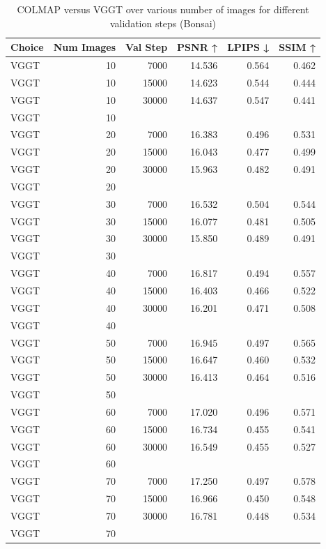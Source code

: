 \begin{table}[H]
\caption{COLMAP versus VGGT over various number of images for different validation steps (Bonsai)}
\label{tab:01_num_images_30000_bonsai}
\begin{tabular}{lrrrrr}
\toprule
Choice & Num Images & Val Step & PSNR ↑ & LPIPS ↓ & SSIM ↑ \\
\midrule
VGGT & 10 & 7000 & 14.536 & 0.564 & 0.462 \\
VGGT & 10 & 15000 & 14.623 & 0.544 & 0.444 \\
VGGT & 10 & 30000 & 14.637 & 0.547 & 0.441 \\
VGGT & 10 &  &  &  &  \\
VGGT & 20 & 7000 & 16.383 & 0.496 & 0.531 \\
VGGT & 20 & 15000 & 16.043 & 0.477 & 0.499 \\
VGGT & 20 & 30000 & 15.963 & 0.482 & 0.491 \\
VGGT & 20 &  &  &  &  \\
VGGT & 30 & 7000 & 16.532 & 0.504 & 0.544 \\
VGGT & 30 & 15000 & 16.077 & 0.481 & 0.505 \\
VGGT & 30 & 30000 & 15.850 & 0.489 & 0.491 \\
VGGT & 30 &  &  &  &  \\
VGGT & 40 & 7000 & 16.817 & 0.494 & 0.557 \\
VGGT & 40 & 15000 & 16.403 & 0.466 & 0.522 \\
VGGT & 40 & 30000 & 16.201 & 0.471 & 0.508 \\
VGGT & 40 &  &  &  &  \\
VGGT & 50 & 7000 & 16.945 & 0.497 & 0.565 \\
VGGT & 50 & 15000 & 16.647 & 0.460 & 0.532 \\
VGGT & 50 & 30000 & 16.413 & 0.464 & 0.516 \\
VGGT & 50 &  &  &  &  \\
VGGT & 60 & 7000 & 17.020 & 0.496 & 0.571 \\
VGGT & 60 & 15000 & 16.734 & 0.455 & 0.541 \\
VGGT & 60 & 30000 & 16.549 & 0.455 & 0.527 \\
VGGT & 60 &  &  &  &  \\
VGGT & 70 & 7000 & 17.250 & 0.497 & 0.578 \\
VGGT & 70 & 15000 & 16.966 & 0.450 & 0.548 \\
VGGT & 70 & 30000 & 16.781 & 0.448 & 0.534 \\
VGGT & 70 &  &  &  &  \\

\end{tabular}
\end{table}
